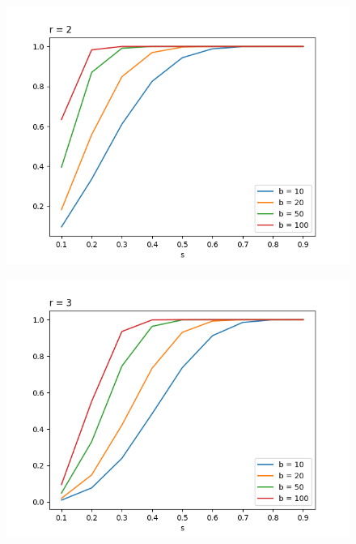\documentclass[11pt,a4paper]{scrartcl}
\begin{document}
\begin{figure}
\centering
\begin{minipage}{.5\textwidth}
  \centering
  \includegraphics[width=.99\linewidth]{q3r2}
  \label{fig:r2}
\end{minipage}%
\begin{minipage}{.5\textwidth}
  \centering
  \includegraphics[width=.99\linewidth]{q3r3}
  \label{fig:r3}
\end{minipage}
\end{figure}
\end{document}
